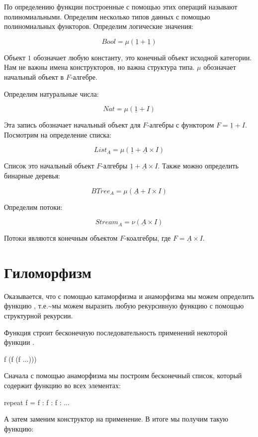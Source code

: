 По определению функции построенные с помощью этих операций называют
полиномиальными. Определим несколько типов данных с помощью
полиномиальных функторов. Определим логические значения:

\[Bool = \mu(\underline{1} + \underline{1})\]

Объект $1$ обозначает любую константу, это конечный объект исходной
категории. Нам не важны имена конструкторов, но важна структура типа.
$\mu$ обозначает начальный объект в $F$-алгебре.

Определим натуральные числа:

\[Nat = \mu(\underline{1} + I)\]

Эта запись обозначает начальный объект для $F$-алгебры с функтором
$F=\underline{1}+I$. Посмотрим на определение списка:

\[List_A = \mu(\underline{1} + \underline{A} \times I)\]

Список это начальный объект $F$-алгебры
$\underline{1}+\underline{A}\times I$. Также можно определить бинарные
деревья:

\[BTree_A = \mu(\underline{A} + I \times I )\]

Определим потоки:

\[Stream_A = \nu (\underline{A} \times I)\]

Потоки являются конечным объектом $F$-коалгебры, где
$F= \underline{A} \times I$.

\section{Гиломорфизм}

Оказывается, что с помощью катаморфизма и анаморфизма мы можем
определить функцию , т.е.\textasciitilde{}мы можем выразить
любую рекурсивную функцию с помощью структурной рекурсии.

Функция  строит бесконечную последовательность применений
некоторой функции .


\begin{code}
f (f (f ...)))
\end{code}

Сначала с помощью анаморфизма мы построим бесконечный список, который
содержит функцию  во всех элементах:


\begin{code}
repeat f = f : f : f : ...
\end{code}

А затем заменим конструктор \In{:} на применение. В итоге мы получим
такую функцию:


